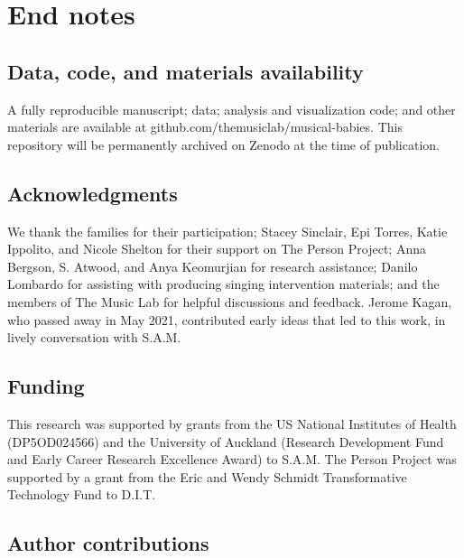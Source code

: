 \documentclass[
]{article}
\begin{document}
\newpage

\section*{End notes}\label{end-notes}

\subsection*{Data, code, and materials
availability}\label{data-code-and-materials-availability}

A fully reproducible manuscript; data; analysis and visualization code;
and other materials are available at
github.com/themusiclab/musical-babies. This repository will be
permanently archived on Zenodo at the time of publication.

\subsection*{Acknowledgments}\label{acknowledgments}

We thank the families for their participation; Stacey Sinclair, Epi
Torres, Katie Ippolito, and Nicole Shelton for their support on The
Person Project; Anna Bergson, S. Atwood, and Anya Keomurjian for
research assistance; Danilo Lombardo for assisting with producing
singing intervention materials; and the members of The Music Lab for
helpful discussions and feedback. Jerome Kagan, who passed away in May
2021, contributed early ideas that led to this work, in lively
conversation with S.A.M.

\subsection*{Funding}\label{funding}

This research was supported by grants from the US National Institutes of
Health (DP5OD024566) and the University of Auckland (Research
Development Fund and Early Career Research Excellence Award) to S.A.M.
The Person Project was supported by a grant from the Eric and Wendy
Schmidt Transformative Technology Fund to D.I.T.

\subsection*{Author contributions}\label{author-contributions}
\end{document}
